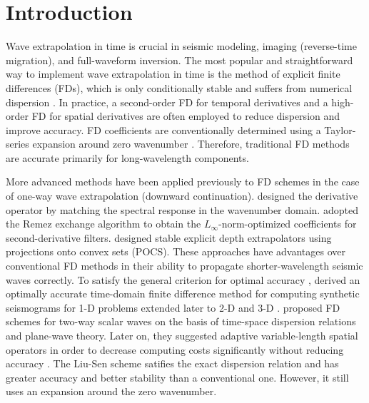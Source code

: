 
\section{Introduction}

Wave extrapolation in time is crucial in seismic modeling, imaging (reverse-time migration), and full-waveform inversion. 
The most popular and straightforward way to implement wave extrapolation in time is 
the method of explicit finite differences (FDs), 
which is only conditionally stable and 
suffers from numerical dispersion \cite[]{Wu,kastner}. 
In practice, a second-order FD for temporal derivatives and a high-order FD for spatial derivatives are often employed to reduce dispersion and improve accuracy.
FD coefficients are conventionally determined using a Taylor-series expansion around zero wavenumber \cite[]{dablain,kindelan}.
Therefore, traditional FD methods are accurate primarily for long-wavelength components.
 
More advanced methods have been applied previously to FD schemes in the case of one-way wave extrapolation (downward continuation).
\cite{holberg,holberg1} designed the derivative operator by matching the spectral response in the wavenumber domain.
\cite{soubaras} adopted the Remez exchange algorithm to obtain the $L_{\infty}$-norm-optimized coefficients for second-derivative filters.  
\cite{mousa} designed stable explicit depth extrapolators using projections onto convex sets (POCS). 
These approaches have advantages over conventional FD methods in their ability to propagate shorter-wavelength seismic waves correctly. 
To satisfy the general criterion for optimal accuracy \cite[]{gellerg},
\cite{geller1} derived an optimally accurate time-domain finite difference method for computing
synthetic seismograms for 1-D problems extended later to 2-D and 3-D \cite[]{geller2}.
\cite{liu} proposed FD schemes for two-way scalar waves on the basis of time-space dispersion relations and plane-wave theory.
Later on, they suggested adaptive variable-length spatial operators in order to decrease computing costs significantly without reducing accuracy \cite[]{adapt}.
The Liu-Sen scheme satifies the exact dispersion relation and has
greater accuracy and better stability than a conventional one. 
However, it still uses an expansion around the zero wavenumber.

